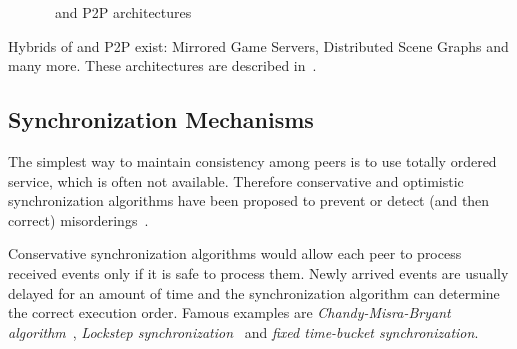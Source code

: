 \begin{figure} 
\centering  
{}  
\caption{\cs~and P2P architectures}
\end{figure}

Hybrids of {\cs} and P2P exist: Mirrored Game Servers, Distributed Scene Graphs and many more. These architectures are described in~\cite{Ldsg, Scheating, Fgame, Csync}.


\subsection{Synchronization Mechanisms}
\label{syncalgr}

The simplest way to maintain consistency among peers is to use totally ordered service, which is often not available. Therefore conservative and optimistic synchronization algorithms have been proposed to prevent or detect (and then correct) misorderings~\cite{Fgame}. 

Conservative synchronization algorithms would allow each peer to process received events only if it is safe to process them. Newly arrived events are usually delayed for an amount of time and the synchronization algorithm can determine the correct execution order. Famous examples are \emph{Chandy-Misra-Bryant algorithm}~\cite{Chandy, Bryant}, \emph{Lockstep synchronization}~\cite{Flockstep} and \emph{fixed time-bucket synchronization}. %

